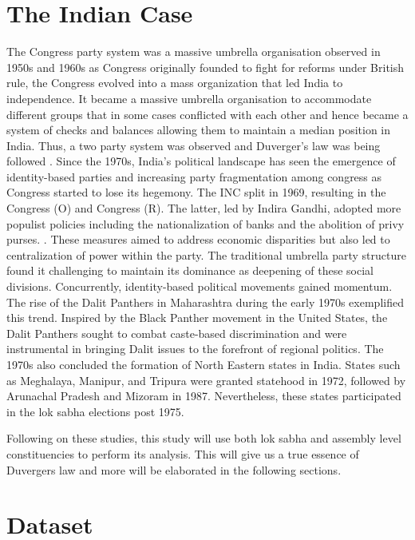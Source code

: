 \section{The Indian Case}
The Congress party system \citep{kothari1967india, candland1997congress} was a massive umbrella organisation observed in 1950s and 1960s as Congress originally founded to fight for reforms under British rule, the Congress evolved into a mass organization that led India to independence. It became a massive umbrella organisation to accommodate different groups that in some cases conflicted with each other and hence became a system of checks and balances allowing them to maintain a median position in India. Thus, a two party system was observed and Duverger's law was being followed \citep{riker1982two}. Since the 1970s, India's political landscape has seen the emergence of identity-based parties and increasing party fragmentation among congress as Congress started to lose its hegemony. The INC  split in 1969, resulting in the Congress (O) and Congress (R). The latter, led by Indira Gandhi, adopted more populist policies including the nationalization of banks and the abolition of privy purses. \citep{Guha2011article}. These measures aimed to address economic disparities but also led to centralization of power within the party. The traditional umbrella party structure found it challenging to maintain its dominance as deepening of these social divisions. Concurrently, identity-based political movements gained momentum\citep{farooqui2016can}. The rise of the Dalit Panthers in Maharashtra during the early 1970s exemplified this trend. Inspired by the Black Panther movement in the United States, the Dalit Panthers sought to combat caste-based discrimination and were instrumental in bringing Dalit issues to the forefront of regional politics. The 1970s also concluded the formation of North Eastern states in India. States such as Meghalaya, Manipur, and Tripura were granted statehood in 1972, followed by Arunachal Pradesh and Mizoram in 1987.  Nevertheless, these states participated in the lok sabha elections post 1975.

\vspace{0.3cm}


Following on these studies, this study will use both lok sabha and assembly level constituencies to perform its analysis. This will give us a true essence of Duvergers law and more will be elaborated in the following sections.

\section{Dataset}

